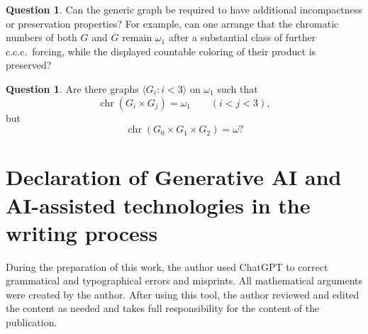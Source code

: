 \documentclass{amsart}
\numberwithin{equation}{section}
\theoremstyle{definition}
\newtheorem{question}[theorem]{Question}
\theoremstyle{remark}
\newcommand{\chr}{\operatorname{chr}}
\begin{document}
\begin{question}
Can the generic graph be required to have additional incompactness or
preservation properties?  For example, can one arrange that the
chromatic numbers of both $G$ and $\overline G$ remain $\omega_1$ after
a substantial class of further c.c.c.\ forcing, while the displayed
countable coloring of their product is preserved?
\end{question}


\begin{question}
Are there graphs $\langle G_i:i<3\rangle$ on $\omega_1$ such that
\begin{displaymath}
 \chr(G_i\times G_j)=\omega_1\qquad(i<j<3),
\end{displaymath}
but
\begin{displaymath}
 \chr(G_0\times G_1\times G_2)=\omega?
\end{displaymath}
\end{question}


\fi

\section*{Declaration of Generative AI and AI-assisted technologies in the writing process}

During the preparation of this work, the author used ChatGPT to
correct grammatical and typographical errors and misprints.  All
mathematical arguments were created by the author.  After using this
tool, the author reviewed and edited the content as needed and takes
full responsibility for the content of the publication.
\end{document}
